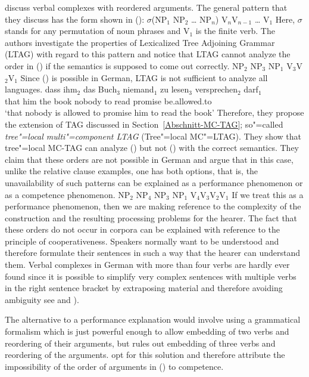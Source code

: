 \citet{JBR2000a} discuss verbal complexes with reordered arguments. The general pattern that they
discuss has the form shown in ():
\ea
$\sigma$(NP$_1$ NP$_2$ \ldots{} NP$_n$) V$_{n}$V$_{n-1}$ \ldots{} V$_{1}$
\z
Here, $\sigma$ stands for any permutation of noun phrases and V$_{1}$ is the finite verb.
The authors investigate the properties of Lexicalized Tree Adjoining Grammar (LTAG) with regard to this
pattern and notice that LTAG cannot analyze the order in () if the semantics is supposed to
come out correctly.
\ea
NP$_2$ NP$_3$ NP$_1$ V$_{3}$V$_{2}$V$_{1}$
\z
Since () is possible in German, LTAG is not sufficient to analyze all languages.
\ea
\gll dass ihm$_2$ das Buch$_3$ niemand$_1$ zu lesen$_3$ versprechen$_2$ darf$_1$\\
     that him     the book     nobody     to read      promise         be.allowed.to\\
\glt `that nobody is allowed to promise him to read the book' 
\z
Therefore, they propose the extension of TAG discussed in Section~\ref{Abschnitt-MC-TAG}; so"=called \emph{tree"=local multi"=component LTAG} (Tree"=local MC"=LTAG).
They show that tree"=local MC-TAG can analyze () but not () with the correct semantics. They claim that these orders are not possible in German
and argue that in this case, unlike the relative clause examples, one has both options, that is, the
unavailability of such patterns can be explained as a performance phenomenon or as a
competence phenomenon.
\ea
\label{ex-mc-ltag-fails}
NP$_2$ NP$_4$ NP$_3$ NP$_1$ V$_{4}$V$_{3}$V$_{2}$V$_{1}$
\z
If we treat this as a performance phenomenon, then we are making reference to the complexity of the construction and the resulting processing problems
for the hearer. The fact that these orders do not occur in corpora can be explained with reference to the principle of cooperativeness.
Speakers normally want to be understood and therefore formulate their sentences in such a way that the hearer can understand them.
Verbal complexes in German with more than four verbs are hardly ever found since it is possible to simplify very complex sentences with multiple verbs in the 
right sentence bracket by extraposing material and therefore avoiding ambiguity see  and
).

The alternative to a performance explanation would involve using a grammatical formalism which is
just powerful enough to allow embedding of two verbs and reordering of their arguments, but rules
out embedding of three verbs and reordering of the arguments. \citet{JBR2000a} opt for this solution
and therefore attribute the impossibility of the order of arguments in () to competence. 

